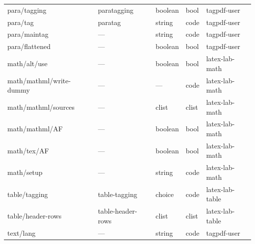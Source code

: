 \begin{longtable}{lllll}
\\[4pt]\midrule
para/tagging     &paratagging      &boolean          &bool  &tagpdf-user\\
para/tag         &paratag          &string           &code  &tagpdf-user\\
para/maintag     &---              &string           &code  &tagpdf-user\\
para/flattened   &---              &boolean          &bool  &tagpdf-user\\[4pt]\midrule
math/alt/use     &---              &boolean          &bool  &latex-lab-math\\
math/mathml/write-dummy & ---      &---              &code  &latex-lab-math\\
math/mathml/sources &---           & clist           &clist &latex-lab-math\\
math/mathml/AF      &---           &boolean          &bool  &latex-lab-math\\
math/tex/AF       & ---            &boolean          &bool  &latex-lab-math\\
math/setup        & ---            &string           &code  &latex-lab-math\\  [4pt]\midrule
table/tagging     & table-tagging  &choice           &code  &latex-lab-table\\
table/header-rows & table-header-rows& clist         &clist &latex-lab-table\\[4pt]\midrule
text/lang         & ---             & string         & code &tagpdf-user  
\\\bottomrule
\end{longtable}
